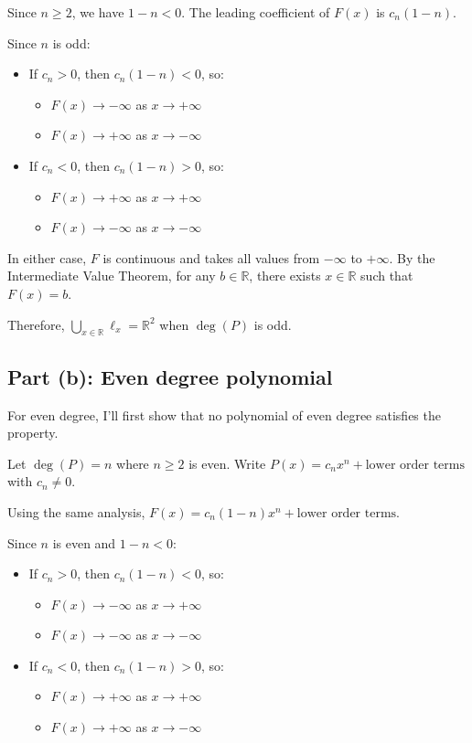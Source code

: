 \documentclass[12pt,a4paper]{article}
\theoremstyle{definition}
\begin{document}
        Since $n \geq 2$, we have $1-n < 0$. The leading coefficient of $F(x)$ is $c_n(1-n)$.

        Since $n$ is odd:
        \begin{itemize}
            \item If $c_n > 0$, then $c_n(1-n) < 0$, so:
            \begin{itemize}
                \item $F(x) \to -\infty$ as $x \to +\infty$
                \item $F(x) \to +\infty$ as $x \to -\infty$
            \end{itemize}
            \item If $c_n < 0$, then $c_n(1-n) > 0$, so:
            \begin{itemize}
                \item $F(x) \to +\infty$ as $x \to +\infty$
                \item $F(x) \to -\infty$ as $x \to -\infty$
            \end{itemize}
        \end{itemize}

        In either case, $F$ is continuous and takes all values from $-\infty$ to $+\infty$. By the Intermediate Value Theorem, for any $b \in \mathbb{R}$, there exists $x \in \mathbb{R}$ such that $F(x) = b$.

        Therefore, $\bigcup_{x \in \mathbb{R}} \ell_x = \mathbb{R}^2$ when $\deg(P)$ is odd.

        \subsection*{Part (b): Even degree polynomial}

        For even degree, I'll first show that no polynomial of even degree satisfies the property.

        Let $\deg(P) = n$ where $n \geq 2$ is even. Write $P(x) = c_nx^n + \text{lower order terms}$ with $c_n \neq 0$.

        Using the same analysis, $F(x) = c_n(1-n)x^n + \text{lower order terms}$.

        Since $n$ is even and $1-n < 0$:
        \begin{itemize}
            \item If $c_n > 0$, then $c_n(1-n) < 0$, so:
            \begin{itemize}
                \item $F(x) \to -\infty$ as $x \to +\infty$
                \item $F(x) \to -\infty$ as $x \to -\infty$
            \end{itemize}
            \item If $c_n < 0$, then $c_n(1-n) > 0$, so:
            \begin{itemize}
                \item $F(x) \to +\infty$ as $x \to +\infty$
                \item $F(x) \to +\infty$ as $x \to -\infty$
            \end{itemize}
        \end{itemize}
\end{document}
